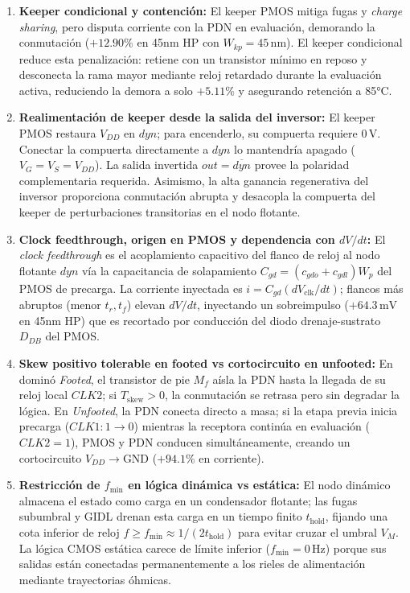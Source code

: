 \begin{enumerate}[leftmargin=1.5em,itemsep=0.04em,parsep=0pt,topsep=0.1em]
\item \textbf{Keeper condicional y contención:} El keeper PMOS mitiga fugas y \textit{charge sharing}, pero disputa corriente con la PDN en evaluación, demorando la conmutación ($+12.90\%$ en 45nm HP con $W_{kp}=45\,\text{nm}$). El keeper condicional reduce esta penalización: retiene con un transistor mínimo en reposo y desconecta la rama mayor mediante reloj retardado durante la evaluación activa, reduciendo la demora a solo $+5.11\%$ y asegurando retención a 85°C.

\pagebreak
\item \textbf{Realimentación de keeper desde la salida del inversor:} El keeper PMOS restaura $V_{DD}$ en $dyn$; para encenderlo, su compuerta requiere $0\,\text{V}$. Conectar la compuerta directamente a $dyn$ lo mantendría apagado ($V_G=V_S=V_{DD}$). La salida invertida $out = \overline{dyn}$ provee la polaridad complementaria requerida. Asimismo, la alta ganancia regenerativa del inversor proporciona conmutación abrupta y desacopla la compuerta del keeper de perturbaciones transitorias en el nodo flotante.

\item \textbf{Clock feedthrough, origen en PMOS y dependencia con $dV/dt$:} El \textit{clock feedthrough} es el acoplamiento capacitivo del flanco de reloj al nodo flotante $dyn$ vía la capacitancia de solapamiento $C_{gd} = (c_{gdo}+c_{gdl})W_p$ del PMOS de precarga. La corriente inyectada es $i = C_{gd}(dV_{\text{clk}}/dt)$; flancos más abruptos (menor $t_r, t_f$) elevan $dV/dt$, inyectando un sobreimpulso ($+64.3\,\text{mV}$ en 45nm HP) que es recortado por conducción del diodo drenaje-sustrato $D_{DB}$ del PMOS.

\item \textbf{Skew positivo tolerable en footed vs cortocircuito en unfooted:} En dominó \textit{Footed}, el transistor de pie $M_f$ aísla la PDN hasta la llegada de su reloj local $CLK2$; si $T_{\text{skew}}>0$, la conmutación se retrasa pero sin degradar la lógica. En \textit{Unfooted}, la PDN conecta directo a masa; si la etapa previa inicia precarga ($CLK1: 1 \to 0$) mientras la receptora continúa en evaluación ($CLK2=1$), PMOS y PDN conducen simultáneamente, creando un cortocircuito $V_{DD} \to \text{GND}$ ($+94.1\%$ en corriente).

\item \textbf{Restricción de $f_{\min}$ en lógica dinámica vs estática:} El nodo dinámico almacena el estado como carga en un condensador flotante; las fugas subumbral y GIDL drenan esta carga en un tiempo finito $t_{\text{hold}}$, fijando una cota inferior de reloj $f \ge f_{\min} \approx 1/(2t_{\text{hold}})$ para evitar cruzar el umbral $V_M$. La lógica CMOS estática carece de límite inferior ($f_{\min}=0\,\text{Hz}$) porque sus salidas están conectadas permanentemente a los rieles de alimentación mediante trayectorias óhmicas.


\end{enumerate}
